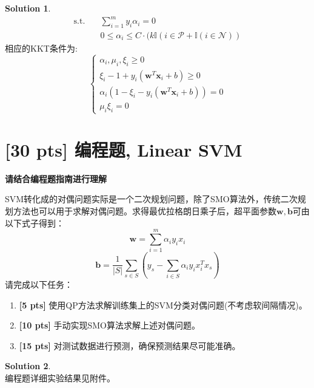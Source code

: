 \documentclass[a4paper,UTF8]{article}
\theoremstyle{definition}
\newtheorem*{solution}{Solution}
\begin{document}
\begin{solution}
\begin{equation}
\begin{split}
\text{s.t.}&  \quad \sum_{i=1}^m y_i\alpha_i = 0\\
& \quad 0 \leq \alpha_i \leq C\cdot (k\mathbb{I}(i\in \mathcal{P} + \mathbb{I}(i\in \mathcal{N}))
\end{split}
\end{equation}
相应的KKT条件为:
\begin{equation}\nonumber
\begin{cases}
\alpha_i,\mu_i,\xi_i \geq 0\\
\xi_i - 1 + y_i(\mathbf{w}^T\mathbf{x}_i + b)\geq 0\\
\alpha_i(1 - \xi_i - y_i(\mathbf{w}^T\mathbf{x}_i + b)) = 0\\
\mu_i\xi_i = 0
\end{cases}
\end{equation}
\end{solution}

\section{[30 pts] 编程题, Linear SVM}
\textbf{请结合编程题指南进行理解}

SVM转化成的对偶问题实际是一个二次规划问题，除了SMO算法外，传统二次规划方法也可以用于求解对偶问题。求得最优拉格朗日乘子后，超平面参数$\mathbf{w,b}$可由以下式子得到：
\begin{equation}
\mathbf{w} = \sum_{i=1}^m \alpha_i y_i x_i
\end{equation}
\begin{equation}
\mathbf{b} = \frac{1}{|S|}\sum_{s\in S} (y_s-\sum_{i\in S}\alpha_i y_i x_i^T x_s)
\end{equation}
请完成以下任务：
\begin{enumerate}[(1)]
	\item \textbf{[5 pts]} 使用QP方法求解训练集上的SVM分类对偶问题(不考虑软间隔情况)。
	\item \textbf{[10 pts]} 手动实现SMO算法求解上述对偶问题。
	\item \textbf{[15 pts]} 对测试数据进行预测，确保预测结果尽可能准确。
\end{enumerate}

\begin{solution}
~\\编程题详细实验结果见附件。
\end{solution}
\end{document}
